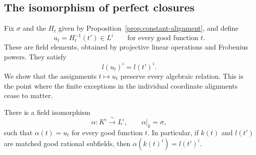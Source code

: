 \subsection{The isomorphism of perfect closures}

Fix \(\sigma\) and the \(H_t\) given by
Proposition~\ref{prop:constant-alignment}, and define
\[
 u_t=H_t^{-1}(t')\in L^i
 \qquad\text{for every good function }t.
\]
These are field elements, obtained by projective linear operations and
Frobenius powers.  They satisfy
\begin{equation}\label{eq:field-good-perfect}
 l(u_t)^i=l(t')^i.
\end{equation}
We show that the assignments \(t\mapsto u_t\) preserve every algebraic
relation.  This is the point where the finite exceptions in the individual
coordinate alignments cease to matter.

\begin{theorem}\label{thm:field-isomorphism}
There is a field isomorphism
\[
 \alpha:K^i\xrightarrow{\ \sim\ }L^i,\qquad \alpha|_k=\sigma,
\]
such that \(\alpha(t)=u_t\) for every good function \(t\).
In particular, if \(k(t)\) and \(l(t')\) are matched good rational
subfields, then \(\alpha(k(t)^i)=l(t')^i\).
\end{theorem}


